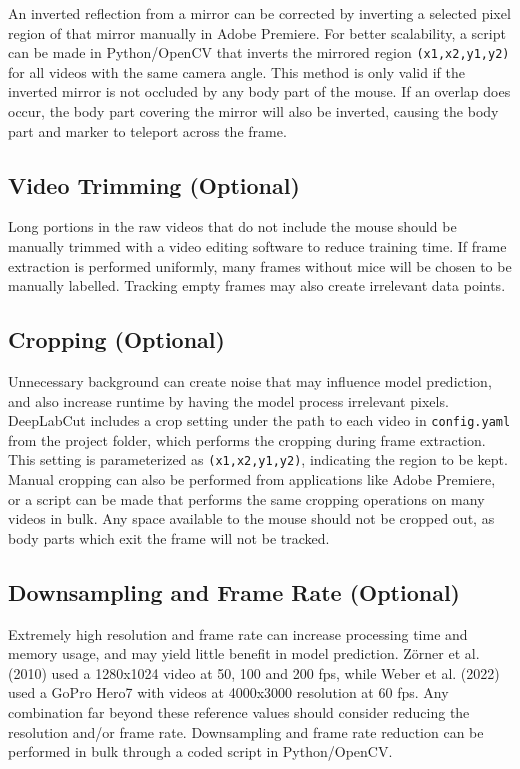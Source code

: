 \documentclass[11pt]{article}
\renewcommand{\[}{%
  \par\smallskip\noindent
  \begin{center}%
  \setlength{\fboxsep}{5pt}%
  \setlength{\fboxrule}{0.35pt}%
  \begin{lrbox}{\almaEquationBox}%
  $\displaystyle
}
\renewcommand{\]}{%
  $%
  \end{lrbox}%
  \fcolorbox{equationLine}{equationBack}{\usebox{\almaEquationBox}}%
  \end{center}%
  \smallskip\par
}
\begin{document}
An inverted reflection from a mirror can be corrected by inverting a selected pixel region of that mirror manually in Adobe Premiere. For better scalability, a script can be made in Python/OpenCV that inverts the mirrored region \texttt{(x1,x2,y1,y2)} for all videos with the same camera angle. This method is only valid if the inverted mirror is not occluded by any body part of the mouse. If an overlap does occur, the body part covering the mirror will also be inverted, causing the body part and marker to teleport across the frame. 

\subsection{Video Trimming (Optional)}

Long portions in the raw videos that do not include the mouse should be manually trimmed with a video editing software to reduce training time. If frame extraction is performed uniformly, many frames without mice will be chosen to be manually labelled. Tracking empty frames may also create irrelevant data points. 

\subsection{Cropping (Optional)}

Unnecessary background can create noise that may influence model prediction, and also increase runtime by having the model process irrelevant pixels. DeepLabCut includes a crop setting under the path to each video in \texttt{config.yaml} from the project folder, which performs the cropping during frame extraction. This setting is parameterized as \texttt{(x1,x2,y1,y2)}, indicating the region to be kept. Manual cropping can also be performed from applications like Adobe Premiere, or a script can be made that performs the same cropping operations on many videos in bulk. Any space available to the mouse should not be cropped out, as body parts which exit the frame will not be tracked. 

\subsection{Downsampling and Frame Rate (Optional)}

Extremely high resolution and frame rate can increase processing time and memory usage, and may yield little benefit in model prediction. Zörner et al. (2010) used a 1280x1024 video at 50, 100 and 200 fps, while Weber et al. (2022) used a GoPro Hero7 with videos at 4000x3000 resolution at 60 fps. Any combination far beyond these reference values should consider reducing the resolution and/or frame rate. Downsampling and frame rate reduction can be performed in bulk through a coded script in Python/OpenCV. 
\end{document}
